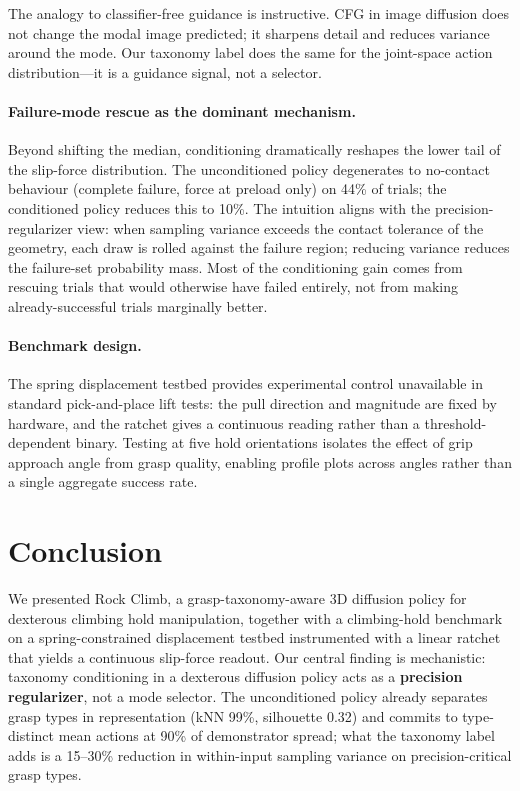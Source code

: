 \documentclass[11pt]{article}
\begin{document}
The analogy to classifier-free guidance \citep{ho2022cfg} is instructive. CFG in image
diffusion does not change the modal image predicted; it sharpens detail and reduces
variance around the mode. Our taxonomy label does the same for the joint-space action
distribution---it is a guidance signal, not a selector.

\paragraph{Failure-mode rescue as the dominant mechanism.}
Beyond shifting the median, conditioning dramatically reshapes the lower tail of the
slip-force distribution. The unconditioned policy degenerates to no-contact behaviour
(complete failure, force at preload only) on 44\% of trials; the conditioned policy
reduces this to 10\%. The intuition aligns with the precision-regularizer view: when
sampling variance exceeds the contact tolerance of the geometry, each draw is rolled
against the failure region; reducing variance reduces the failure-set probability
mass. Most of the conditioning gain comes from rescuing trials that would otherwise
have failed entirely, not from making already-successful trials marginally better.

\paragraph{Benchmark design.}
The spring displacement testbed provides experimental control unavailable in standard
pick-and-place lift tests: the pull direction and magnitude are fixed by hardware, and
the ratchet gives a continuous reading rather than a threshold-dependent binary. Testing
at five hold orientations isolates the effect of grip approach angle from grasp quality,
enabling profile plots across angles rather than a single aggregate success rate.


\section{Conclusion}
We presented Rock Climb, a grasp-taxonomy-aware 3D diffusion policy for dexterous
climbing hold manipulation, together with a climbing-hold benchmark on a
spring-constrained displacement testbed instrumented with a linear ratchet that
yields a continuous slip-force readout. Our central finding is mechanistic:
taxonomy conditioning in a dexterous diffusion policy acts as a \textbf{precision
regularizer}, not a mode selector. The unconditioned policy already separates grasp
types in representation (kNN 99\%, silhouette 0.32) and commits to type-distinct
mean actions at 90\% of demonstrator spread; what the taxonomy label adds is a
15--30\% reduction in within-input sampling variance on precision-critical grasp
types.
\end{document}
